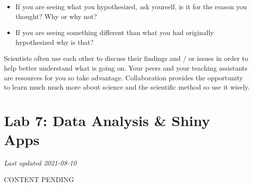 \documentclass[
]{book}
\providecommand{\tightlist}{%
  \setlength{\itemsep}{0pt}\setlength{\parskip}{0pt}}
\begin{document}
\begin{itemize}
\tightlist
\item
  If you are seeing what you hypothesized, ask yourself, is it for the reason you thought? Why or why not?
\item
  If you are seeing something different than what you had originally hypothesized why is that?
\end{itemize}

Scientists often use each other to discuss their findings and / or issues in order to help better understand what is going on. Your peers and your teaching assistants are resources for you so take advantage. Collaboration provides the opportunity to learn much much more about science and the scientific method so use it wisely.

\hypertarget{lab-7-data-analysis-shiny-apps}{%
\chapter*{Lab 7: Data Analysis \& Shiny Apps}\label{lab-7-data-analysis-shiny-apps}}

\emph{Last updated 2021-08-10}

CONTENT PENDING
\end{document}
